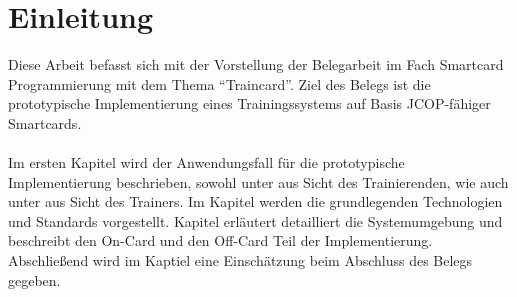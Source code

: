\section{Einleitung}
\label{sec:0}
Diese Arbeit befasst sich mit der Vorstellung der Belegarbeit im Fach Smartcard Programmierung mit dem Thema ``Traincard''. 
Ziel des Belegs ist die prototypische Implementierung eines Trainingssystems auf Basis JCOP-fähiger Smartcards. 
\\
\\
Im ersten Kapitel  wird der Anwendungsfall für die prototypische Implementierung beschrieben, sowohl unter  aus Sicht des Trainierenden, wie auch unter  aus Sicht des Trainers. Im Kapitel  werden die grundlegenden Technologien und Standards vorgestellt.  Kapitel  erläutert detailliert die Systemumgebung und beschreibt den On-Card und den Off-Card Teil der Implementierung. Abschließend wird im Kaptiel  eine Einschätzung beim Abschluss des Belegs gegeben. 